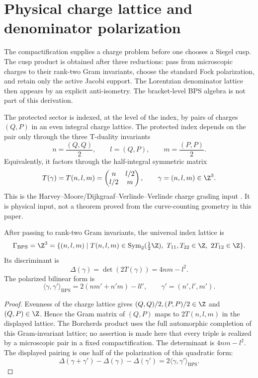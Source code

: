 \section{Physical charge lattice and denominator polarization}
\label{sec:physical-charge-lattice-duality}

The compactification supplies a charge problem before one chooses a
Siegel cusp.  The cusp product is obtained after three reductions:
pass from microscopic charges to their rank-two Gram invariants, choose
the standard Fock polarization, and retain only the active Jacobi
support.  The Lorentzian denominator lattice then appears by an explicit
anti-isometry.  The bracket-level BPS algebra is not part of this
derivation.

\begin{assumption}
The protected sector is indexed, at the level of the index, by pairs of
charges $(Q,P)$ in an even integral charge lattice.  The protected
index depends on the pair only through the three T-duality invariants
$$
n=\frac{(Q,Q)}2,\qquad l=(Q,P),\qquad m=\frac{(P,P)}2.
$$
Equivalently, it factors through the half-integral symmetric matrix
$$
T(\gamma)=T(n,l,m)=
\begin{pmatrix}n&l/2\\ l/2&m\end{pmatrix},
\qquad \gamma=(n,l,m)\in\Z^3.
$$
This is the Harvey--Moore/Dijkgraaf--Verlinde--Verlinde charge
grading input \cite{HM,DVV}.  It is physical input, not a theorem
proved from the curve-counting geometry in this paper.
\end{assumption}

\begin{proposition}
After passing to rank-two Gram invariants, the universal index lattice is
$$
\Gamma_{\mathrm{BPS}}=\Z^3
=\{(n,l,m)\mid T(n,l,m)\in\operatorname{Sym}_2(\tfrac12\Z),
\ T_{11},T_{22}\in\Z,\ 2T_{12}\in\Z\}.
$$
Its discriminant is
$$
\Delta(\gamma)=\det(2T(\gamma))=4nm-l^2.
$$
The polarized bilinear form is
$$
\langle\gamma,\gamma'\rangle_{\mathrm{BPS}}
=2(nm'+n'm)-ll',
\qquad \gamma'=(n',l',m').
$$
\end{proposition}

\begin{proof}
Evenness of the charge lattice gives
$(Q,Q)/2,(P,P)/2\in\Z$ and $(Q,P)\in\Z$.  Hence the Gram matrix of
$(Q,P)$ maps to $2T(n,l,m)$ in the displayed lattice.  The Borcherds
product uses the full automorphic completion of this Gram-invariant
lattice; no assertion is made here that every triple is realized by a
microscopic pair in a fixed compactification.  The determinant is
$4nm-l^2$.  The displayed pairing is one half of the polarization of
this quadratic form:
$$
\Delta(\gamma+\gamma')-\Delta(\gamma)-\Delta(\gamma')
=2\langle\gamma,\gamma'\rangle_{\mathrm{BPS}}.
$$
\end{proof}

